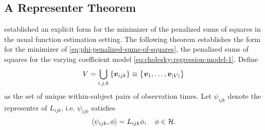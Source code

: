 


\subsection{A Representer Theorem}

\cite{wahba1990spline} established an explicit form for the minimizer of the penalized sums of squares in the usual function estimation setting. The following theorem establishes the form for the minimizer of \eqref{eq:phi-penalized-sums-of-squares}, the penalized sums of squares for the varying coefficient model \eqref{eq:cholesky-regression-model-1}. Define  
\[
V = \bigcup\limits_{i,j,k} \left\{\mbox{\boldmath $v$}_{ijk} \right\} \equiv \left\{ \mbox{\boldmath $v$}_1,\dots,\mbox{\boldmath $v$}_{\vert V \vert} \right\}
\]
\noindent
as the set of unique within-subject pairs of observation times. Let $\psi_{ijk}$ denote the representer of  $L_{ijk}$, i.e. $\psi_{ijk}$ satisfies
\[
\langle \psi_{ijk}, \phi \rangle = L_{ijk}\phi, \quad \phi \in \mathcal{H}.
\]

